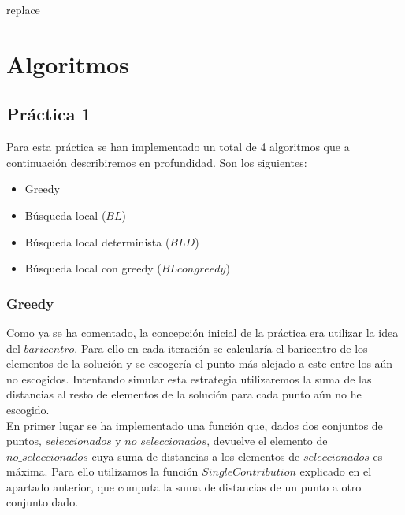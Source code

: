 \documentclass[11pt,a4paper]{article}
\begin{document}
	\begin{algorithm}[H]
		\caption{replace}
	\end{algorithm}

	\section{Algoritmos}
	
 	\subsection{Práctica 1}
	
	Para esta práctica se han implementado un total de 4 algoritmos que a continuación describiremos en profundidad. Son los siguientes:
	\begin{itemize}
		\item Greedy
		\item Búsqueda local ($BL$)
		\item Búsqueda local determinista ($BLD$)
		\item Búsqueda local con greedy ($BL con greedy$)
	\end{itemize}
		
	\subsubsection{Greedy}
	
	Como ya se ha comentado, la concepción inicial de la práctica era utilizar la idea del $baricentro$. Para ello en cada iteración se calcularía el baricentro de los elementos de la solución y se escogería el punto más alejado a este entre los aún no escogidos. Intentando simular esta estrategia utilizaremos la suma de las distancias al resto de elementos de la solución para cada punto aún no he escogido. \\
	
	En primer lugar se ha implementado una función que, dados dos conjuntos de puntos, $seleccionados$ y $no\_seleccionados$, devuelve el elemento de $no\_seleccionados$ cuya suma de distancias a los elementos de $seleccionados$ es máxima. Para ello utilizamos la función $SingleContribution$ explicado en el apartado anterior, que computa la suma de distancias de un punto a otro conjunto dado. \\ 
\end{document}
